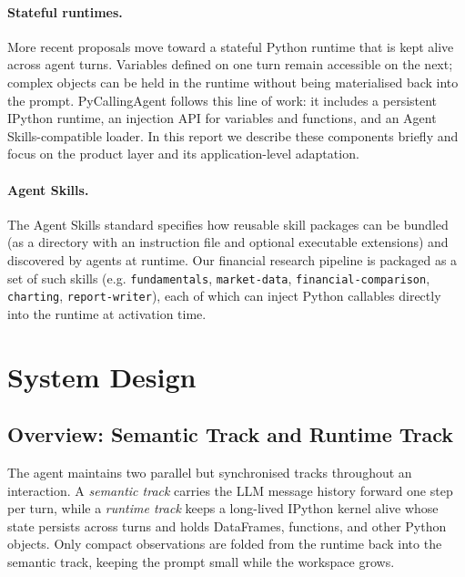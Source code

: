 \documentclass[11pt,a4paper]{article}
\begin{document}
\paragraph{Stateful runtimes.}
More recent proposals move toward a stateful Python runtime that is kept alive across agent turns. Variables defined on one turn remain accessible on the next; complex objects can be held in the runtime without being materialised back into the prompt. PyCallingAgent follows this line of work: it includes a persistent IPython runtime, an injection API for variables and functions, and an Agent Skills-compatible loader. In this report we describe these components briefly and focus on the product layer and its application-level adaptation.

\paragraph{Agent Skills.}
The Agent Skills standard specifies how reusable skill packages can be bundled (as a directory with an instruction file and optional executable extensions) and discovered by agents at runtime. Our financial research pipeline is packaged as a set of such skills (e.g. \texttt{fundamentals}, \texttt{market-data}, \texttt{financial-comparison}, \texttt{charting}, \texttt{report-writer}), each of which can inject Python callables directly into the runtime at activation time.

\section{System Design}

\subsection{Overview: Semantic Track and Runtime Track}

The agent maintains two parallel but synchronised tracks throughout an interaction. A \emph{semantic track} carries the LLM message history forward one step per turn, while a \emph{runtime track} keeps a long-lived IPython kernel alive whose state persists across turns and holds DataFrames, functions, and other Python objects. Only compact observations are folded from the runtime back into the semantic track, keeping the prompt small while the workspace grows.
\end{document}
